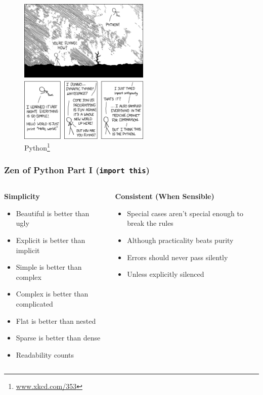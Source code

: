 \documentclass{beamer}
\begin{document}
  \begin{frame}
    \begin{figure}
      \begin{center}
      \includegraphics[height=200pt,keepaspectratio]{xkcd_python.png}
      \caption
      {
        Python\footnote{\url{www.xkcd.com/353}} 
      }
      \end{center}
    \end{figure}
  \end{frame}
 
  \begin{frame}
    \frametitle{Zen of Python Part I (\texttt{import this})}
    \begin{columns}
      \begin{column}{0.53\textwidth}
	\textbf{Simplicity}
        \begin{itemize}
          \item Beautiful is better than ugly
          \item Explicit is better than implicit
          \item Simple is better than complex
          \item Complex is better than complicated
	  \item Flat is better than nested
	  \item Sparse is better than dense
	  \item Readability counts
        \end{itemize}
      \end{column}
      
      \begin{column}{0.47\textwidth}
        \textbf{Consistent (When Sensible)}
        \begin{itemize}
	  \item Special cases aren't special enough to break the rules
	  \item Although practicality beats purity
          \item Errors should never pass silently
          \item Unless explicitly silenced
        \end{itemize}
      \end{column}
    \end{columns}
  \end{frame}
\end{document}

